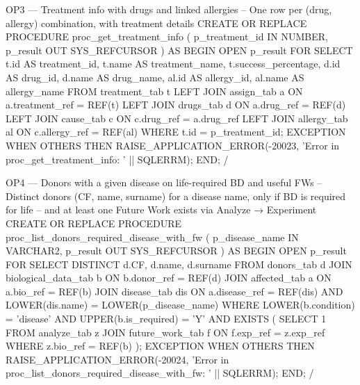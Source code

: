 \documentclass[11pt,a4paper]{article}
\begin{document}
\begin{sqlbox}{OP3 — Treatment info with drugs and linked allergies}
-- One row per (drug, allergy) combination, with treatment details
CREATE OR REPLACE PROCEDURE proc_get_treatment_info (
  p_treatment_id IN NUMBER,
  p_result       OUT SYS_REFCURSOR
) AS
BEGIN
  OPEN p_result FOR
    SELECT t.id                      AS treatment_id,
           t.name                    AS treatment_name,
           t.success_percentage,
           d.id                      AS drug_id,
           d.name                    AS drug_name,
           al.id                     AS allergy_id,
           al.name                   AS allergy_name
      FROM treatment_tab t
      LEFT JOIN assign_tab a
             ON a.treatment_ref = REF(t)
      LEFT JOIN drugs_tab d
             ON a.drug_ref = REF(d)
      LEFT JOIN cause_tab c
             ON c.drug_ref = a.drug_ref
      LEFT JOIN allergy_tab al
             ON c.allergy_ref = REF(al)
       WHERE t.id = p_treatment_id;
EXCEPTION
  WHEN OTHERS THEN
    RAISE_APPLICATION_ERROR(-20023, 'Error in proc_get_treatment_info: ' || SQLERRM);
END;
/ 
\end{sqlbox}

\begin{sqlbox}{OP4 — Donors with a given disease on life-required BD and useful FWs}
-- Distinct donors (CF, name, surname) for a disease name, only if BD is required for life
-- and at least one Future Work exists via Analyze → Experiment
CREATE OR REPLACE PROCEDURE proc_list_donors_required_disease_with_fw (
  p_disease_name IN VARCHAR2,
  p_result       OUT SYS_REFCURSOR
) AS
BEGIN
  OPEN p_result FOR
    SELECT DISTINCT d.CF,
                    d.name,
                    d.surname
      FROM donors_tab d
      JOIN biological_data_tab b
        ON b.donor_ref = REF(d)
      JOIN affected_tab a
        ON a.bio_ref = REF(b)
      JOIN disease_tab dis
        ON a.disease_ref = REF(dis)
       AND LOWER(dis.name) = LOWER(p_disease_name)
     WHERE LOWER(b.condition) = 'disease'
       AND UPPER(b.is_required) = 'Y'
       AND EXISTS (
             SELECT 1
               FROM analyze_tab z
               JOIN future_work_tab f
                 ON f.exp_ref = z.exp_ref
              WHERE z.bio_ref = REF(b)
            );
EXCEPTION
  WHEN OTHERS THEN
    RAISE_APPLICATION_ERROR(-20024, 'Error in proc_list_donors_required_disease_with_fw: ' || SQLERRM);
END;
/ 
\end{sqlbox}
\end{document}
